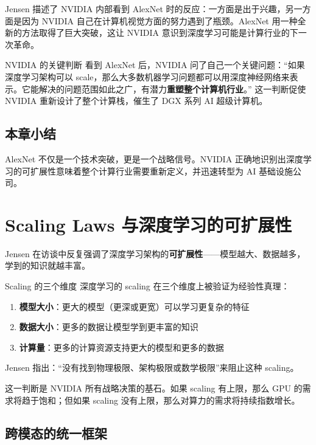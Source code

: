 \documentclass[a4paper]{article}
\begin{document}
Jensen 描述了 NVIDIA 内部看到 AlexNet 时的反应：一方面是出于兴趣，另一方面是因为 NVIDIA 自己在计算机视觉方面的努力遇到了瓶颈。AlexNet 用一种全新的方法取得了巨大突破，这让 NVIDIA 意识到深度学习可能是计算行业的下一次革命。

\begin{knowledgebox}{NVIDIA 的关键判断}
看到 AlexNet 后，NVIDIA 问了自己一个关键问题：``如果深度学习架构可以 scale，那么大多数机器学习问题都可以用深度神经网络来表示。它能解决的问题范围如此之广，有潜力\textbf{重塑整个计算机行业}。'' 这一判断促使 NVIDIA 重新设计了整个计算栈，催生了 DGX 系列 AI 超级计算机。
\end{knowledgebox}

\subsection{本章小结}
AlexNet 不仅是一个技术突破，更是一个战略信号。NVIDIA 正确地识别出深度学习的可扩展性意味着整个计算行业需要重新定义，并迅速转型为 AI 基础设施公司。

\section{Scaling Laws 与深度学习的可扩展性}

Jensen 在访谈中反复强调了深度学习架构的\textbf{可扩展性}——模型越大、数据越多，学到的知识就越丰富。

\begin{importantbox}{Scaling 的三个维度}
深度学习的 scaling 在三个维度上被验证为经验性真理：
\begin{enumerate}
    \item \textbf{模型大小}：更大的模型（更深或更宽）可以学习更复杂的特征
    \item \textbf{数据大小}：更多的数据让模型学到更丰富的知识
    \item \textbf{计算量}：更多的计算资源支持更大的模型和更多的数据
\end{enumerate}
Jensen 指出：``没有找到物理极限、架构极限或数学极限''来阻止这种 scaling。
\end{importantbox}

这一判断是 NVIDIA 所有战略决策的基石。如果 scaling 有上限，那么 GPU 的需求将趋于饱和；但如果 scaling 没有上限，那么对算力的需求将持续指数增长。

\subsection{跨模态的统一框架}
\end{document}
